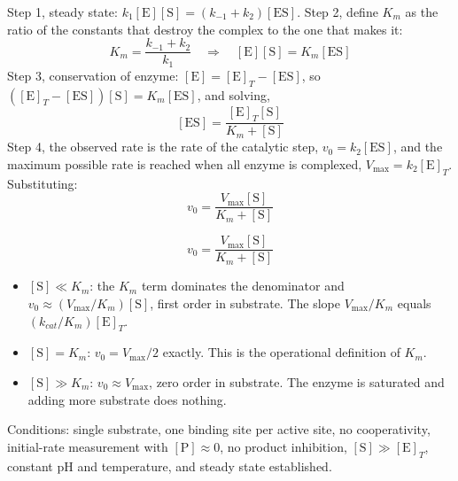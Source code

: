 \begin{thmbox}[title={PRINCIPLE: derivation of the Michaelis-Menten equation}]
Step 1, steady state: $k_1[\mathrm{E}][\mathrm{S}]=(k_{-1}+k_2)[\mathrm{ES}]$.
Step 2, define $K_m$ as the ratio of the constants that destroy the complex to the one
that makes it:
\[
K_m=\frac{k_{-1}+k_2}{k_1}\quad\Longrightarrow\quad
[\mathrm{E}][\mathrm{S}]=K_m[\mathrm{ES}]
\]
Step 3, conservation of enzyme: $[\mathrm{E}]=[\mathrm{E}]_T-[\mathrm{ES}]$, so
$([\mathrm{E}]_T-[\mathrm{ES}])[\mathrm{S}]=K_m[\mathrm{ES}]$, and solving,
\[
[\mathrm{ES}]=\frac{[\mathrm{E}]_T[\mathrm{S}]}{K_m+[\mathrm{S}]}
\]
Step 4, the observed rate is the rate of the catalytic step, $v_0=k_2[\mathrm{ES}]$,
and the maximum possible rate is reached when all enzyme is complexed,
$V_{\max}=k_2[\mathrm{E}]_T$. Substituting:
\[
v_0=\frac{V_{\max}[\mathrm{S}]}{K_m+[\mathrm{S}]}
\]
\end{thmbox}

\begin{keybox}[title={MEMORIZE: the Michaelis-Menten equation and its three limits}]
\[
v_0=\frac{V_{\max}[\mathrm{S}]}{K_m+[\mathrm{S}]}
\]
\begin{itemize}
\item $[\mathrm{S}]\ll K_m$: the $K_m$ term dominates the denominator and
$v_0\approx(V_{\max}/K_m)[\mathrm{S}]$, first order in substrate. The slope
$V_{\max}/K_m$ equals $(k_{cat}/K_m)[\mathrm{E}]_T$.
\item $[\mathrm{S}]=K_m$: $v_0=V_{\max}/2$ exactly. This is the operational definition
of $K_m$.
\item $[\mathrm{S}]\gg K_m$: $v_0\approx V_{\max}$, zero order in substrate. The enzyme
is saturated and adding more substrate does nothing.
\end{itemize}
Conditions: single substrate, one binding site per active site, no cooperativity,
initial-rate measurement with $[\mathrm{P}]\approx 0$, no product inhibition,
$[\mathrm{S}]\gg[\mathrm{E}]_T$, constant pH and temperature, and steady state
established.
\end{keybox}

